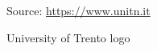 \lipsum[1]

\begin{figure} %
  \centering
  \def\stackalignment{l} %
  {\scriptsize \parbox[t]{\linewidth}{ Source: \url{https://www.unitn.it}} }
  \caption{University of Trento logo}
  \label{fig:unitn_wrapfigure_left}
\end{figure}

\lipsum[1]
